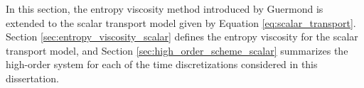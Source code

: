 In this section, the entropy viscosity method introduced by Guermond
\cite{guermond_ev}\cite{guermond_secondorder} is extended to the scalar
transport model given by Equation \eqref{eq:scalar_transport}.
Section \ref{sec:entropy_viscosity_scalar} defines the entropy viscosity
for the scalar transport model, and Section \ref{sec:high_order_scheme_scalar}
summarizes the high-order system for each of the time discretizations
considered in this dissertation.
